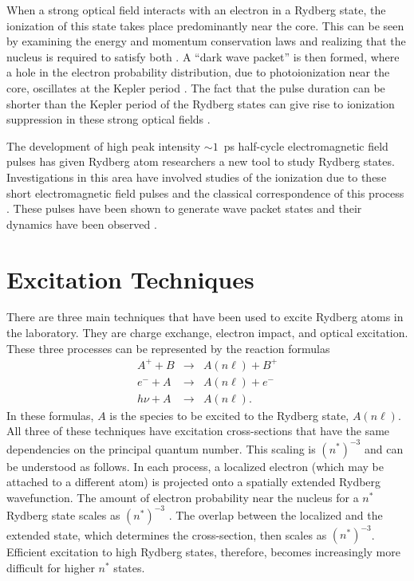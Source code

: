 When a strong optical field interacts with an electron in a Rydberg state, the
ionization of this state takes place predominantly near the core.  This can be
seen by examining the energy and momentum conservation laws and realizing that
the nucleus is required to satisfy both \cite{Eberly:91}.  A ``dark wave
packet'' is then formed, where a hole in the electron probability distribution,
due to photoionization near the core, oscillates at the Kepler period
\cite{Noordam:92a,Jones:93b}.  The fact that the pulse duration can be shorter
than the Kepler period of the Rydberg states can give rise to ionization
suppression in these strong optical fields
\cite{Parker:90,Stapelfeldt:91,Jones:91}.

The development of high peak intensity $\sim 1$~ps half-cycle electromagnetic
field pulses \cite{You:93} has given Rydberg atom researchers a new tool to
study Rydberg states.  Investigations in this area have involved studies of the
ionization due to these short electromagnetic field pulses \cite{Jones:93a}
and the classical correspondence of this process \cite{Frey:96}.  These pulses
have been shown to generate wave packet states and their dynamics have been
observed \cite{Raman:96,Jones:96}.

\section{Excitation Techniques}
\hspace{\parindent}  There are three main techniques that have been used to
excite Rydberg atoms in the laboratory.  They are charge exchange, electron
impact, and optical excitation.  These three processes can be represented
by the reaction formulas
\begin{eqnarray}
A^+  + B & \rightarrow & A(n\ell) + B^+ \\
e^-  + A & \rightarrow & A(n\ell) + e^- \\
h\nu + A & \rightarrow & A(n\ell).
\end{eqnarray}
In these formulas, $A$ is the species to be excited to the Rydberg
state, $A(n\ell)$.  All three of these techniques have excitation cross-sections
that have the same dependencies on the principal quantum number.  This scaling is
$(n^*)^{-3}$ and can be understood as follows.  In each process, a localized
electron (which may be attached to a different atom) is projected onto a
spatially extended Rydberg wavefunction.  The amount of electron probability near
the nucleus for a $n^*$ Rydberg state scales as $(n^*)^{-3}$
\cite{Bethe_Salpeter}.  The overlap between the localized and the extended
state, which determines the cross-section, then scales as $(n^*)^{-3}$. 
Efficient excitation to high Rydberg states, therefore, becomes increasingly
more difficult for higher $n^*$ states.

